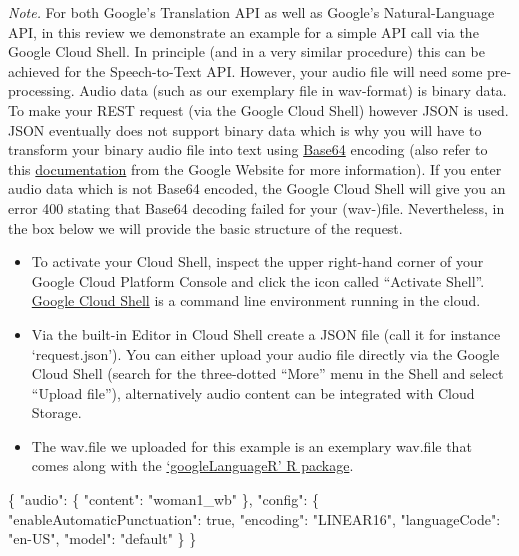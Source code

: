 \documentclass[
]{book}
\newenvironment{Shaded}{\begin{snugshade}}{\end{snugshade}}
\newcommand{\NormalTok}[1]{#1}
\newcommand{\SpecialCharTok}[1]{\textcolor[rgb]{0.00,0.00,0.00}{#1}}
\newcommand{\StringTok}[1]{\textcolor[rgb]{0.31,0.60,0.02}{#1}}
\begin{document}
\emph{Note.} For both Google's Translation API as well as Google's Natural-Language API, in this review we demonstrate an example for a simple API call via the Google Cloud Shell. In principle (and in a very similar procedure) this can be achieved for the Speech-to-Text API. However, your audio file will need some pre-processing. Audio data (such as our exemplary file in wav-format) is binary data. To make your REST request (via the Google Cloud Shell) however JSON is used. JSON eventually does not support binary data which is why you will have to transform your binary audio file into text using \href{\%22https://en.wikipedia.org/wiki/Base64\%22}{Base64} encoding (also refer to this \href{\%22https://cloud.google.com/speech-to-text/docs/base64-encoding\#linux\%22}{documentation} from the Google Website for more information). If you enter audio data which is not Base64 encoded, the Google Cloud Shell will give you an error 400 stating that Base64 decoding failed for your (wav-)file. Nevertheless, in the box below we will provide the basic structure of the request.

\begin{itemize}
\item
  To activate your Cloud Shell, inspect the upper right-hand corner of your Google Cloud Platform Console and click the icon called ``Activate Shell''. \href{\%22https://cloud.google.com/shell/\#how_do_i_get_started\%22}{Google Cloud Shell} is a command line environment running in the cloud.
\item
  Via the built-in Editor in Cloud Shell create a JSON file (call it for instance `request.json'). You can either upload your audio file directly via the Google Cloud Shell (search for the three-dotted ``More'' menu in the Shell and select ``Upload file''), alternatively audio content can be integrated with Cloud Storage.
\item
  The wav.file we uploaded for this example is an exemplary wav.file that comes along with the \href{\%22https://cran.r-project.org/web/packages/googleLanguageR/index.html\%22}{`googleLanguageR' R package}.
\end{itemize}

\begin{Shaded}
\begin{Highlighting}[]
\NormalTok{\{}
  \StringTok{"audio"}\SpecialCharTok{:}\NormalTok{ \{}
    \StringTok{"content"}\SpecialCharTok{:} \StringTok{"woman1\_wb"}
\NormalTok{  \},}
  \StringTok{"config"}\SpecialCharTok{:}\NormalTok{ \{}
    \StringTok{"enableAutomaticPunctuation"}\SpecialCharTok{:}\NormalTok{ true,}
    \StringTok{"encoding"}\SpecialCharTok{:} \StringTok{"LINEAR16"}\NormalTok{,}
    \StringTok{"languageCode"}\SpecialCharTok{:} \StringTok{"en{-}US"}\NormalTok{,}
    \StringTok{"model"}\SpecialCharTok{:} \StringTok{"default"}
\NormalTok{  \}}
\NormalTok{\}}
\end{Highlighting}
\end{Shaded}
\end{document}
